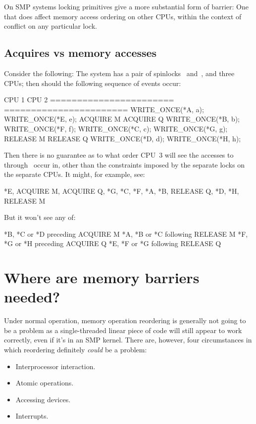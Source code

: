 On SMP systems locking primitives give a more substantial form of barrier:
One that does affect memory access ordering on other CPUs, within the
context of conflict on any particular lock.


\subsection{Acquires vs memory accesses}

Consider the following:
The system has a pair of spinlocks~ and~, and three CPUs; then
should the following sequence of events occur:

\begin{VerbatimU}
	CPU 1                   CPU 2
	======================= =======================
	WRITE_ONCE(*A, a);      WRITE_ONCE(*E, e);
	ACQUIRE M               ACQUIRE Q
	WRITE_ONCE(*B, b);      WRITE_ONCE(*F, f);
	WRITE_ONCE(*C, c);      WRITE_ONCE(*G, g);
	RELEASE M               RELEASE Q
	WRITE_ONCE(*D, d);      WRITE_ONCE(*H, h);
\end{VerbatimU}

Then there is no guarantee as to what order CPU~3 will see the accesses
to~ through~ occur in, other than the constraints imposed by
the separate locks on the separate CPUs.
It might, for example, see:

\begin{VerbatimU}[tabsize=1]
	*E, ACQUIRE M, ACQUIRE Q, *G, *C, *F, *A, *B, RELEASE Q, *D, *H, RELEASE M
\end{VerbatimU}

But it won't see any of:

\begin{VerbatimU}
	*B, *C or *D preceding ACQUIRE M
	*A, *B or *C following RELEASE M
	*F, *G or *H preceding ACQUIRE Q
	*E, *F or *G following RELEASE Q
\end{VerbatimU}


\section{Where are memory barriers needed?}

Under normal operation, memory operation reordering is generally not going to
be a problem as a single-threaded linear piece of code will still appear to
work correctly, even if it's in an SMP kernel.
There are, however, four circumstances in which reordering definitely
\emph{could} be a problem:

\begin{itemize}[itemsep=0pt]
 \item Interprocessor interaction.
 \item Atomic operations.
 \item Accessing devices.
 \item Interrupts.
\end{itemize}

